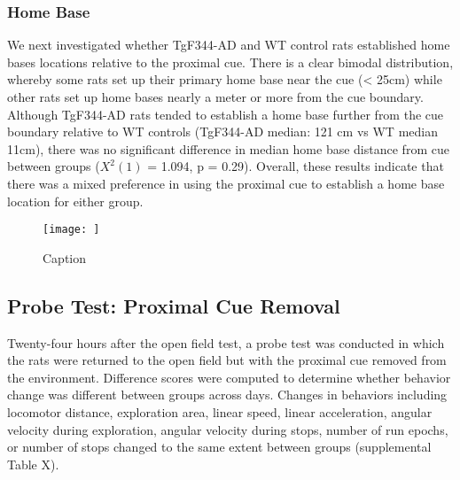 \documentclass[fleqn,10pt]{wlscirep}
\begin{document}
\subsubsection*{Home Base} 
We next investigated whether TgF344-AD and WT control rats established home bases locations relative to the proximal cue. There is a clear bimodal distribution, whereby some rats set up their primary home base near the cue (< 25cm) while other rats set up home bases nearly a meter or more from the cue boundary. Although TgF344-AD rats tended to establish a home base further from the cue boundary relative to WT controls (TgF344-AD median: 121 cm vs WT median 11cm), there was no significant difference in median home base distance from cue between groups  ($X^2(1)$  = 1.094, p = 0.29). Overall, these results indicate that there was a mixed preference in using the proximal cue to establish a home base location for either group. 



\begin{figure}
    \centering
    \texttt{[image: ]}
    \caption{Caption}
    \label{proximal_cue_fig}
\end{figure}

\subsection*{Probe Test: Proximal Cue Removal}
Twenty-four hours after the open field test, a probe test was conducted in which the rats were returned to the open field but with the proximal cue removed from the environment. Difference scores were computed to determine whether behavior change was different between groups across days. Changes in behaviors including locomotor distance, exploration area, linear speed, linear acceleration, angular velocity during exploration, angular velocity during stops, number of run epochs, or number of stops changed to the same extent between groups (supplemental Table X). 
\end{document}

